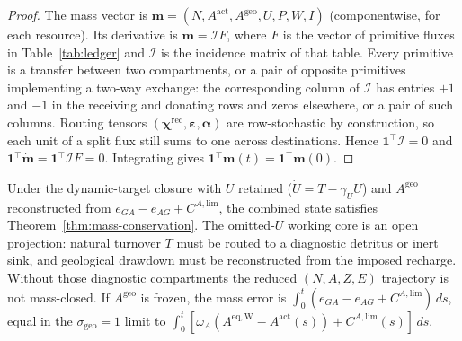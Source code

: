 \documentclass[11pt]{article}
\theoremstyle{definition}
\begin{document}
\begin{proof}
The mass vector is $\mathbf m=(N,A^{\mathrm{act}},A^{\mathrm{geo}},U,P,W,I)$ (componentwise, for each resource). Its derivative is $\dot{\mathbf m}=\mathcal I F$, where $F$ is the vector of primitive fluxes in Table~\ref{tab:ledger} and $\mathcal I$ is the incidence matrix of that table. Every primitive is a transfer between two compartments, or a pair of opposite primitives implementing a two-way exchange: the corresponding column of $\mathcal I$ has entries $+1$ and $-1$ in the receiving and donating rows and zeros elsewhere, or a pair of such columns. Routing tensors $(\boldsymbol\chi^{\mathrm{rec}},\boldsymbol\varepsilon,\boldsymbol\alpha)$ are row-stochastic by construction, so each unit of a split flux still sums to one across destinations. Hence $\mathbf 1^\top\mathcal I=0$ and $\mathbf 1^\top\dot{\mathbf m}=\mathbf 1^\top\mathcal I F=0$. Integrating gives $\mathbf 1^\top\mathbf m(t)=\mathbf 1^\top\mathbf m(0)$.
\end{proof}

\begin{corollary}
\label{cor:mass-recon}
Under the dynamic-target closure with $U$ retained ($\dot U=T-\gamma_U U$) and $A^{\mathrm{geo}}$ reconstructed from $e_{GA}-e_{AG}+C^{A,\mathrm{lim}}$, the combined state satisfies Theorem~\ref{thm:mass-conservation}. The omitted-$U$ working core is an open projection: natural turnover $T$ must be routed to a diagnostic detritus or inert sink, and geological drawdown must be reconstructed from the imposed recharge. Without those diagnostic compartments the reduced $(N,A,Z,E)$ trajectory is not mass-closed. If $A^{\mathrm{geo}}$ is frozen, the mass error is $\int_0^t(e_{GA}-e_{AG}+C^{A,\mathrm{lim}})\,ds$, equal in the $\sigma_{\mathrm{geo}}=1$ limit to $\int_0^t[\omega_A(A^{\mathrm{eq,W}}-A^{\mathrm{act}}(s))+C^{A,\mathrm{lim}}(s)]\,ds$.
\end{corollary}
\end{document}
